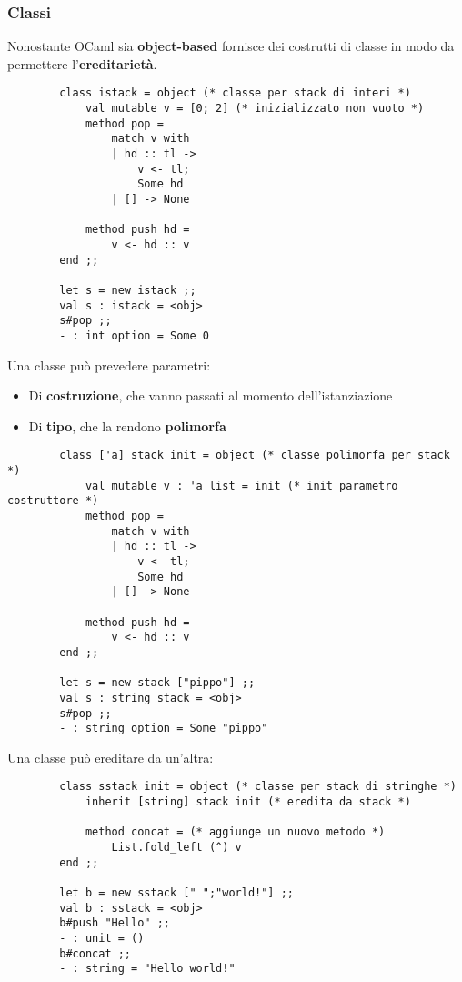 \subsubsection{Classi}
Nonostante OCaml sia \textbf{object-based} fornisce dei costrutti di classe in modo da permettere l'\textbf{ereditarietà}.
\begin{example}
	\begin{lstlisting}
		class istack = object (* classe per stack di interi *)
			val mutable v = [0; 2] (* inizializzato non vuoto *)
			method pop =
				match v with
				| hd :: tl ->
					v <- tl;
					Some hd
				| [] -> None
			
			method push hd =
				v <- hd :: v
		end ;;
		
		let s = new istack ;;
		val s : istack = <obj>
		s#pop ;;
		- : int option = Some 0
	\end{lstlisting}
\end{example}
Una classe può prevedere parametri:
\begin{itemize}
	\item Di \textbf{costruzione}, che vanno passati al momento dell'istanziazione
	\item Di \textbf{tipo}, che la rendono \textbf{polimorfa}
\end{itemize}
\begin{example}
	\begin{lstlisting}
		class ['a] stack init = object (* classe polimorfa per stack *)
			val mutable v : 'a list = init (* init parametro costruttore *)
			method pop =
				match v with
				| hd :: tl ->
					v <- tl;
					Some hd
				| [] -> None
			
			method push hd =
				v <- hd :: v
		end ;;
		
		let s = new stack ["pippo"] ;;
		val s : string stack = <obj>
		s#pop ;;
		- : string option = Some "pippo"
	\end{lstlisting}
\end{example}
Una classe può ereditare da un'altra:
\begin{example}
	\begin{lstlisting}
		class sstack init = object (* classe per stack di stringhe *)
			inherit [string] stack init (* eredita da stack *)
			
			method concat = (* aggiunge un nuovo metodo *)
				List.fold_left (^) v
		end ;;
		
		let b = new sstack [" ";"world!"] ;;
		val b : sstack = <obj>
		b#push "Hello" ;;
		- : unit = ()
		b#concat ;;
		- : string = "Hello world!"
	\end{lstlisting}
\end{example}
